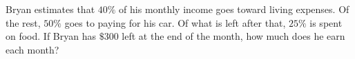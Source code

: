 Bryan estimates that $40\%$ of his monthly income goes toward living expenses. Of the rest, $50\%$ goes to paying for his car. Of what is left after that, $25\%$ is spent on food. If Bryan has $\$300$ left at the end of the month, how much does he earn each month?
